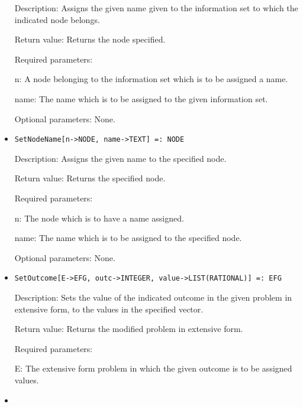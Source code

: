 \begin{itemize}
\bd
\item
[Description:] Assigns the given name given to the information set to
which the indicated node belongs.
\item
[Return value:] Returns the node specified.
\item
[Required parameters:]\hfil\null
	
\bd
\item
[n:] A node belonging to the information set which is to be assigned a
name.
\item
[name:] The name which is to be assigned to the given information set.
\ed

\item
[Optional parameters:] None.
\ed

\item

\protect \large \begin{verbatim}
SetNodeName[n->NODE, name->TEXT] =: NODE
\end{verbatim}\normalsize

\bd
\item
[Description:] Assigns the given name to the specified node.
\item
[Return value:] Returns the specified node.
\item
[Required parameters:]\hfil\null
	
\bd
\item
[n:] The node which is to have a name assigned.
\item
[name:] The name which is to be assigned to the specified node.
\ed

\item
[Optional parameters:] None.
\ed

\item
\protect \large \begin{verbatim}
SetOutcome[E->EFG, outc->INTEGER, value->LIST(RATIONAL)] =: EFG
\end{verbatim}\normalsize
   
\bd
\item
[Description:] Sets the value of the indicated outcome in the given
problem in extensive form, to the values in the specified vector.
\item
[Return value:] Returns the modified problem in extensive form.
\item
[Required parameters:]\hfil\null
	
\bd
\item
[E:] The extensive form problem in which the given outcome is to be
assigned values.
\item


\end{itemize}
